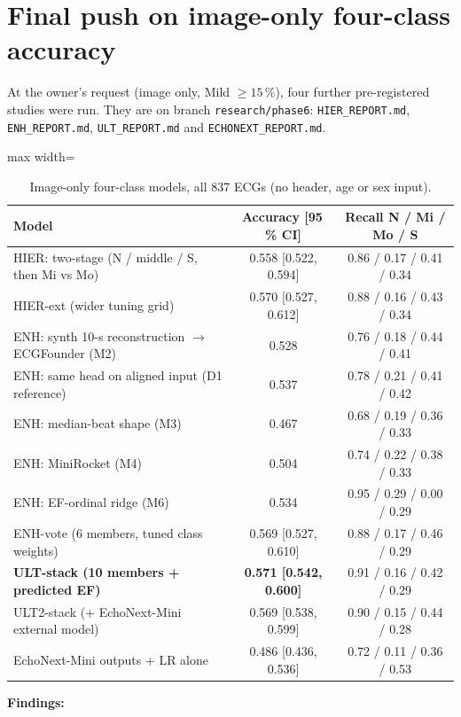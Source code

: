 \section{Final push on image-only four-class accuracy}\label{sec:push}
At the owner's request (image only, Mild $\ge 15$\,\%), four further pre-registered studies were run. They are on
branch \texttt{research/phase6}: \texttt{HIER\_REPORT.md}, \texttt{ENH\_REPORT.md}, \texttt{ULT\_REPORT.md} and
\texttt{ECHONEXT\_REPORT.md}.

\begin{table}[H]\centering\small
\caption{Image-only four-class models, all 837 ECGs (no header, age or sex input).}\label{tab:push}
\begin{adjustbox}{max width=\linewidth}
\begin{tabular}{p{6.2cm}cc}\toprule
Model & Accuracy [95\,\% CI] & Recall N / Mi / Mo / S \\\midrule
HIER: two-stage (N / middle / S, then Mi vs Mo) & 0.558 [0.522, 0.594] & 0.86 / 0.17 / 0.41 / 0.34 \\
HIER-ext (wider tuning grid) & 0.570 [0.527, 0.612] & 0.88 / 0.16 / 0.43 / 0.34 \\
ENH: synth 10-s reconstruction $\to$ ECGFounder (M2) & 0.528 & 0.76 / 0.18 / 0.44 / 0.41 \\
ENH: same head on aligned input (D1 reference) & 0.537 & 0.78 / 0.21 / 0.41 / 0.42 \\
ENH: median-beat shape (M3) & 0.467 & 0.68 / 0.19 / 0.36 / 0.33 \\
ENH: MiniRocket (M4) & 0.504 & 0.74 / 0.22 / 0.38 / 0.33 \\
ENH: EF-ordinal ridge (M6) & 0.534 & 0.95 / 0.29 / 0.00 / 0.29 \\
ENH-vote (6 members, tuned class weights) & 0.569 [0.527, 0.610] & 0.88 / 0.17 / 0.46 / 0.29 \\
\textbf{ULT-stack (10 members + predicted EF)} & \textbf{0.571 [0.542, 0.600]} & 0.91 / 0.16 / 0.42 / 0.29 \\
ULT2-stack (+ EchoNext-Mini external model) & 0.569 [0.538, 0.599] & 0.90 / 0.15 / 0.44 / 0.28 \\
EchoNext-Mini outputs + LR alone & 0.486 [0.436, 0.536] & 0.72 / 0.11 / 0.36 / 0.53 \\\bottomrule
\end{tabular}
\end{adjustbox}
\end{table}
\textbf{Findings:}
